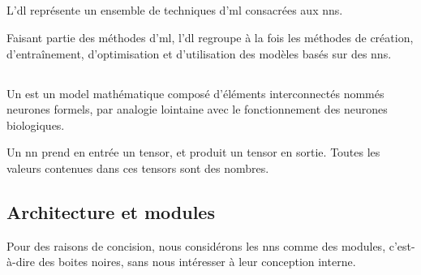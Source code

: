 \subsection{}
\label{subsec:dl} \label{def:dl}
L'\gls{dl} représente un ensemble de techniques d'\gls{ml} consacrées aux \glspl{nn}.

Faisant partie des méthodes d'\gls{ml}, l'\gls{dl} regroupe à la fois les méthodes de création, d'entraînement, d'optimisation et d'utilisation des modèles basés sur des \glspl{nn}.

\subsection{}
\label{def:nn}

Un  est un \gls{model} mathématique composé d'éléments interconnectés nommés neurones formels, %
par analogie lointaine avec le fonctionnement des neurones biologiques.

Un \gls{nn} prend en entrée un \gls{tensor}, %
et produit un \gls{tensor} en sortie.
Toutes les valeurs contenues dans ces \glspl{tensor} sont des nombres.


\subsection{Architecture et modules}
\label{def:module} \label{def:architecture}
Pour des raisons de concision, nous considérons les \glspl{nn} comme des \glspl{module}, c'est-à-dire des boites noires,
sans nous intéresser à leur conception interne.

